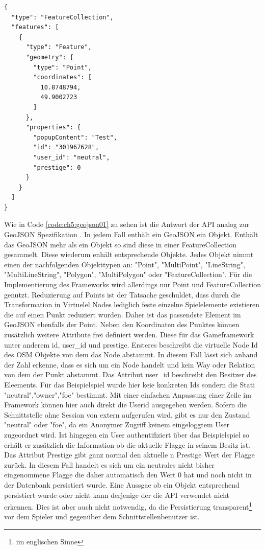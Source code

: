\begin{lstlisting}[caption=GeoJSON Response Location (Reduziert), label=code:ch5:geojson01]
{
  "type": "FeatureCollection",
  "features": [
    {
      "type": "Feature",
      "geometry": {
        "type": "Point",
        "coordinates": [
          10.8748794,
          49.9002723
        ]
      },
      "properties": {
        "popupContent": "Test",
        "id": "301967628",
        "user_id": "neutral",
        "prestige": 0
      }
    }
  ]
}
\end{lstlisting}

Wie in Code \ref{code:ch5:geojson01} zu sehen ist die Antwort der API analog zur GeoJSON Spezifikation \cite{Butler.2008}.
In jedem Fall enthält ein GeoJSON ein Objekt. Enthält das GeoJSON mehr als ein Objekt so sind diese in einer FeatureCollection gesammelt. Diese wiederum enhält entsprechende Objekte.
Jedes Objekt nimmt einen der nachfolgenden Objekttypen an:
"Point", "MultiPoint", "LineString", "MultiLineString", "Polygon", "MultiPolygon" oder "FeatureCollection". Für die Implementierung des Frameworks wird allerdings nur Point und FeatureCollection genutzt. Reduzierung auf Points ist der Tatsache geschuldet, dass durch die Transformation in Virtuelel Nodes lediglich feste einzelne Spielelemente existieren die auf einen Punkt reduziert wurden. Daher ist das passendste Element im GeoJSON ebenfalls der Point. Neben den Koordinaten des Punktes können zusätzlich weitere Attribute frei definiert werden. Diese für das Gameframework unter anderem id, user\_id und prestige. Ersteres beschreibt die virtuelle Node Id des OSM Objekte von dem das Node abstammt. In diesem Fall lässt sich anhand der Zahl erkenne, dass es sich um ein Node handelt und kein Way oder Relation von dem der Punkt abstammt. Das Attribut user\_id beschreibt den Besitzer des Eleements. Für das Beispielspiel wurde hier keie konkreten Ids sondern die Stati "neutral","owner","foe" bestimmt. Mit einer einfachen Anpassung einer Zeile im Framework können hier auch direkt die Userid ausgegeben werden. Sofern die Schnittstelle ohne Session von extern aufgerufen wird, gibt es nur den Zustand "neutral" oder "foe", da ein Anonymer Zugriff keinem eingeloggtem User zugeordnet wird. Ist hingegen ein User authentifiziert über das Beispielspiel so erhält er zusätzlich die Information ob die aktuelle Flagge in seinem Besitz ist.
Das Attribut Prestige gibt ganz normal den aktuelle n Prestige Wert der Flagge zurück. In diesem Fall handelt es sich um ein neutrales nicht bisher eingenommene Flagge die daher automatisch den Wert 0 hat und noch nicht in der Datenbank persistiert wurde. Eine Aussgae ob ein Objekt entsprechend persistiert wurde oder nicht kann derjenige der die API verwendet nicht erkennen. Dies ist aber auch nicht notwendig, da 
die Persistierung transparent\footnote{im englischen Sinne} vor dem Spieler und gegenüber dem Schnittstellenbenutzer ist.

